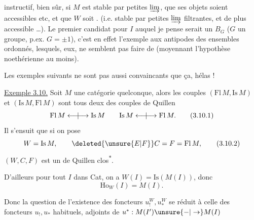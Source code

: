 instructif, bien sûr, si $M$ est stable par petites
$\varinjlim$, que ses objets soient accessibles etc, et
que $W$ soit . (i.e. stable par
petites $\varinjlim$ filtrantes, et de plus accessible
\ldots). Le premier candidat pour $I$ auquel
je pense serait un $B_G$ ($G$ un groupe, p.ex.
$G=\pm1$), c'est en effet l'exemple aux antipodes
des ensembles ordonnés, lesquels, eux, ne
semblent pas faire  de  (moyennant
l'hypothèse noethérienne  au moins).

Les exemples suivants ne  sont pas
aussi convaincants que ça, hélas !

\uline{Exemple 3.10.} Soit $M$ une catégorie
quelconque, alors les couples $(\mathrm{Fl}\,M,\mathrm{Is}\,M)$
et $(\mathrm{Is}\,M,\mathrm{Fl}\,M)$ sont tous deux des
couples de Quillen
\[
 \mathrm{Fl}\,M\mathrel{\longleftarrow\mkern-9mu|\mkern-9mu\longrightarrow}\mathrm{Is}\,M
 \qquad \mathrm{Is}\,M\mathrel{\longleftarrow\mkern-9mu|\mkern-9mu\longrightarrow}\mathrm{Fl}\,M.\tag*{(3.10.1)}
\]
Il s'ensuit que si on pose
\[
 W=\mathrm{Is}\,M,\qquad \deleted{\unsure{E|F}}C=F=\mathrm{Fl}\,M,\tag*{(3.10.2)}
\]
$(W,C,F)$ est un  de Quillen clos\textsuperscript{$*$}.
{\reversemarginpar{}}

D'ailleurs pour tout $I$ dans Cat, on a
$W(I)=\mathrm{Is}(M(I))$, donc \unsure{!}
\[
 \mathrm{Ho}_W(I)=M(I).\tag*{(3.10.3)}
\]

Donc la question de l'existence des foncteurs
$u^W_!,u^W_*$ se réduit à celle des foncteurs
$u_!,u_*$ habituels, adjoints  de $u^*:M(I')\unsure{-|\to}M(I)$

